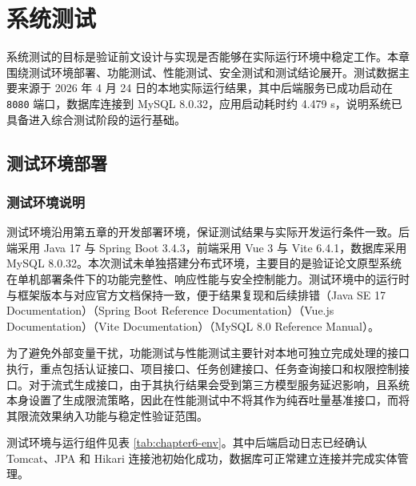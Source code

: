 \chapter{系统测试}

\setlength{\textfloatsep}{10pt plus 2pt minus 2pt}
\setlength{\floatsep}{10pt plus 2pt minus 2pt}
\setlength{\intextsep}{10pt plus 2pt minus 2pt}
\setlength{\abovecaptionskip}{4pt}
\setlength{\belowcaptionskip}{0pt}
\renewcommand{\topfraction}{0.9}
\renewcommand{\bottomfraction}{0.8}
\renewcommand{\textfraction}{0.08}
\renewcommand{\floatpagefraction}{0.8}

系统测试的目标是验证前文设计与实现是否能够在实际运行环境中稳定工作。本章围绕测试环境部署、功能测试、性能测试、安全测试和测试结论展开。测试数据主要来源于 2026 年 4 月 24 日的本地实际运行结果，其中后端服务已成功启动在 \texttt{8080} 端口，数据库连接到 MySQL 8.0.32，应用启动耗时约 4.479 s，说明系统已具备进入综合测试阶段的运行基础。

\section{测试环境部署}

\subsection{测试环境说明}
测试环境沿用第五章的开发部署环境，保证测试结果与实际开发运行条件一致。后端采用 Java 17 与 Spring Boot 3.4.3，前端采用 Vue 3 与 Vite 6.4.1，数据库采用 MySQL 8.0.32。本次测试未单独搭建分布式环境，主要目的是验证论文原型系统在单机部署条件下的功能完整性、响应性能与安全控制能力。测试环境中的运行时与框架版本与对应官方文档保持一致，便于结果复现和后续排错（Java SE 17 Documentation）（Spring Boot Reference Documentation）（Vue.js Documentation）（Vite Documentation）（MySQL 8.0 Reference Manual）\cite{oraclejava17docs2025}\cite{springbootdocs2025}\cite{vuedocs2025}\cite{vitedocs2025}\cite{mysqldocs2025}。

为了避免外部变量干扰，功能测试与性能测试主要针对本地可独立完成处理的接口执行，重点包括认证接口、项目接口、任务创建接口、任务查询接口和权限控制接口。对于流式生成接口，由于其执行结果会受到第三方模型服务延迟影响，且系统本身设置了生成限流策略，因此在性能测试中不将其作为纯吞吐量基准接口，而将其限流效果纳入功能与稳定性验证范围。

测试环境与运行组件见表 \ref{tab:chapter6-env}。其中后端启动日志已经确认 Tomcat、JPA 和 Hikari 连接池初始化成功，数据库可正常建立连接并完成实体管理。

